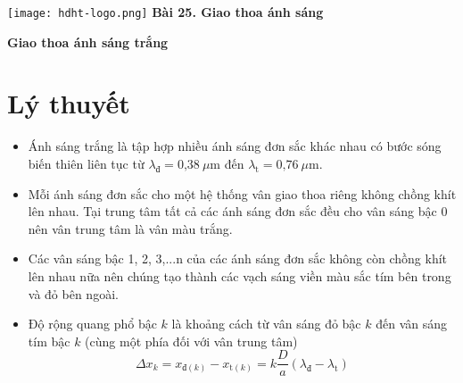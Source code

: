 \newcommand{\chapter}[2][]{
	\newcommand{\chapname}{#2}
	\begin{flushleft}
		\begin{minipage}[t]{\linewidth}
			\texttt{[image: hdht-logo.png]}
			\hspace{0pt}	
			\sffamily\bfseries\large Bài  25. Giao thoa ánh sáng
			\begin{flushleft}
				\huge\bfseries #1
			\end{flushleft}
		\end{minipage}
	\end{flushleft}
	\vspace{1cm}
	\normalfont\normalsize
}
\chapter[Giao thoa ánh sáng trắng]{Giao thoa ánh sáng trắng}

\section{Lý thuyết}

\begin{itemize}

\item Ánh sáng trắng là tập hợp  nhiều ánh sáng đơn sắc khác nhau có bước sóng biến thiên liên tục từ  $\lambda_{\text{đ}} =\text{0,38}\ \mu \text{m}$  đến $\lambda_{\text{t}} =\text{0,76}\ \mu \text{m}$.

\item Mỗi ánh sáng đơn sắc cho một hệ thống vân giao thoa riêng không chồng khít lên nhau. Tại trung tâm tất cả các ánh sáng đơn sắc đều cho vân sáng bậc 0 nên vân trung tâm là vân màu trắng.

\item Các vân sáng bậc 1, 2, 3,...n của các ánh sáng đơn sắc không còn chồng khít lên nhau nữa nên chúng tạo thành các vạch sáng viền màu sắc tím bên trong và đỏ bên ngoài.
\item Độ rộng quang phổ bậc $k$ là khoảng cách từ vân sáng đỏ bậc $k$ đến vân sáng tím bậc $k$ (cùng một phía đối với vân trung tâm)
\begin{equation}
	\Delta x_{k} = x_{\text{đ}(k)}-x_{\text{t}(k)}=k\dfrac{D}{a}(\lambda_\text{đ}-\lambda_\text{t})
\end{equation}
\end{itemize}

